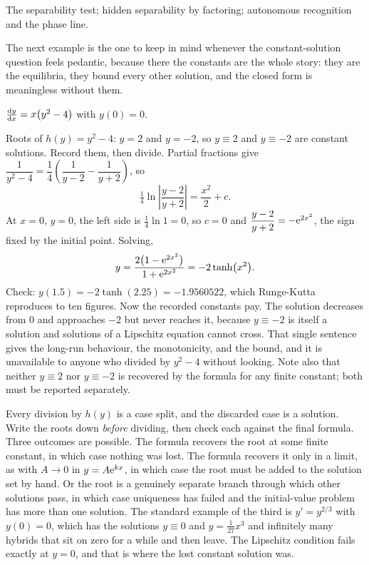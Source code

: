\begin{seealsob}The separability test; hidden separability by factoring; autonomous recognition and the phase line.\end{seealsob}

The next example is the one to keep in mind whenever the constant-solution question feels pedantic, because there the constants are the whole story: they are the equilibria, they bound every other solution, and the closed form is meaningless without them.

\begin{worked}
$\frac{\mathrm{d}y}{\mathrm{d}x}=x\bigl(y^{2}-4\bigr)$ with $y(0)=0$.

Roots of $h(y)=y^{2}-4$: $y=2$ and $y=-2$, so $y\equiv2$ and $y\equiv-2$ are constant solutions. Record them, then divide. Partial fractions give $\dfrac{1}{y^{2}-4}=\dfrac{1}{4}\left(\dfrac{1}{y-2}-\dfrac{1}{y+2}\right)$, so
\[\tfrac14\ln\left|\frac{y-2}{y+2}\right|=\frac{x^{2}}{2}+c.\]
At $x=0$, $y=0$, the left side is $\tfrac14\ln1=0$, so $c=0$ and $\dfrac{y-2}{y+2}=-\mathrm{e}^{2x^{2}}$, the sign fixed by the initial point. Solving,
\[y=\frac{2\bigl(1-\mathrm{e}^{2x^{2}}\bigr)}{1+\mathrm{e}^{2x^{2}}}=-2\tanh\bigl(x^{2}\bigr).\]
Check: $y(1.5)=-2\tanh(2.25)=-1.9560522$, which Runge-Kutta reproduces to ten figures. Now the recorded constants pay. The solution decreases from $0$ and approaches $-2$ but never reaches it, because $y\equiv-2$ is itself a solution and solutions of a Lipschitz equation cannot cross. That single sentence gives the long-run behaviour, the monotonicity, and the bound, and it is unavailable to anyone who divided by $y^{2}-4$ without looking. Note also that neither $y\equiv2$ nor $y\equiv-2$ is recovered by the formula for any finite constant; both must be reported separately.
\end{worked}

\begin{keynote}
Every division by $h(y)$ is a case split, and the discarded case is a solution. Write the roots down \emph{before} dividing, then check each against the final formula. Three outcomes are possible. The formula recovers the root at some finite constant, in which case nothing was lost. The formula recovers it only in a limit, as with $A\to0$ in $y=A\mathrm{e}^{kx}$, in which case the root must be added to the solution set by hand. Or the root is a genuinely separate branch through which other solutions pass, in which case uniqueness has failed and the initial-value problem has more than one solution. The standard example of the third is $y'=y^{2/3}$ with $y(0)=0$, which has the solutions $y\equiv0$ and $y=\tfrac{1}{27}x^{3}$ and infinitely many hybrids that sit on zero for a while and then leave. The Lipschitz condition fails exactly at $y=0$, and that is where the lost constant solution was.
\end{keynote}

